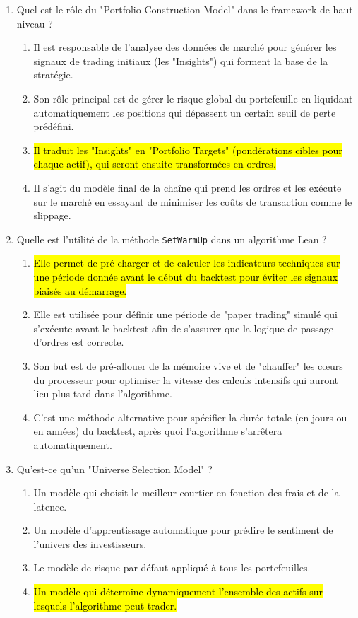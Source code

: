 \documentclass[a4paper,12pt]{article}
\begin{document}
\begin{enumerate}
    \item Quel est le rôle du "Portfolio Construction Model" dans le framework de haut niveau ?
    \begin{enumerate}[label=(\Alph*)]
        \item Il est responsable de l'analyse des données de marché pour générer les signaux de trading initiaux (les "Insights") qui forment la base de la stratégie.
        \item Son rôle principal est de gérer le risque global du portefeuille en liquidant automatiquement les positions qui dépassent un certain seuil de perte prédéfini.
        \item \hl{Il traduit les "Insights" en "Portfolio Targets" (pondérations cibles pour chaque actif), qui seront ensuite transformées en ordres.}
        \item Il s'agit du modèle final de la chaîne qui prend les ordres et les exécute sur le marché en essayant de minimiser les coûts de transaction comme le slippage.
    \end{enumerate}
    
    \item Quelle est l'utilité de la méthode \texttt{SetWarmUp} dans un algorithme Lean ?
    \begin{enumerate}[label=(\Alph*)]
        \item \hl{Elle permet de pré-charger et de calculer les indicateurs techniques sur une période donnée avant le début du backtest pour éviter les signaux biaisés au démarrage.}
        \item Elle est utilisée pour définir une période de "paper trading" simulé qui s'exécute avant le backtest afin de s'assurer que la logique de passage d'ordres est correcte.
        \item Son but est de pré-allouer de la mémoire vive et de "chauffer" les cœurs du processeur pour optimiser la vitesse des calculs intensifs qui auront lieu plus tard dans l'algorithme.
        \item C'est une méthode alternative pour spécifier la durée totale (en jours ou en années) du backtest, après quoi l'algorithme s'arrêtera automatiquement.
    \end{enumerate}

    \item Qu'est-ce qu'un "Universe Selection Model" ?
    \begin{enumerate}[label=(\Alph*)]
        \item Un modèle qui choisit le meilleur courtier en fonction des frais et de la latence.
        \item Un modèle d'apprentissage automatique pour prédire le sentiment de l'univers des investisseurs.
        \item Le modèle de risque par défaut appliqué à tous les portefeuilles.
        \item \hl{Un modèle qui détermine dynamiquement l'ensemble des actifs sur lesquels l'algorithme peut trader.}
    \end{enumerate}
    

\end{enumerate}
\end{document}
